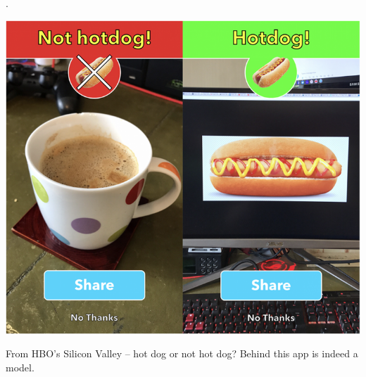 \documentclass[aspectratio=169]{../latex_main/tntbeamer}  %
\begin{document}
	
	\begin{frame}{.}
        \begin{center}
            \includegraphics[scale=.5]{Bild6}
        \end{center}
	    From HBO’s Silicon Valley – hot dog or not hot dog? Behind this app is indeed a model. 
	\end{frame}
	
	
	
\end{document}
